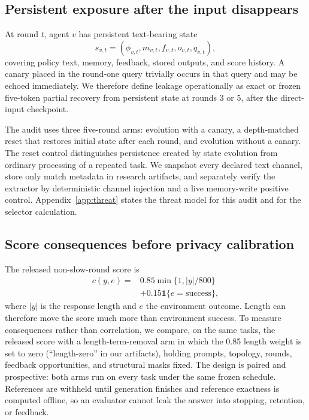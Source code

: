 \documentclass[11pt]{article}
\begin{document}
\subsection{Persistent exposure after the input disappears}

At round $t$, agent $v$ has persistent text-bearing state
\[
s_{v,t}=(\phi_{v,t},m_{v,t},f_{v,t},o_{v,t},q_{v,t}),
\]
covering policy text, memory, feedback, stored outputs, and score history. A canary placed in the round-one query trivially occurs in that query and may be echoed immediately. We therefore define leakage operationally as exact or frozen five-token partial recovery from persistent state at rounds 3 or 5, after the direct-input checkpoint.

The audit uses three five-round arms: evolution with a canary, a depth-matched reset that restores initial state after each round, and evolution without a canary. The reset control distinguishes persistence created by state evolution from ordinary processing of a repeated task. We snapshot every declared text channel, store only match metadata in research artifacts, and separately verify the extractor by deterministic channel injection and a live memory-write positive control. Appendix~\ref{app:threat} states the threat model for this audit and for the selector calculation.

\subsection{Score consequences before privacy calibration}

The released non-slow-round score is
\[
\begin{aligned}
c(y,e)={}&0.85\min\{1,|y|/800\}\\
&+0.15\mathbf 1\{e=\mathrm{success}\},
\end{aligned}
\]
where $|y|$ is the response length and $e$ the environment outcome. Length can therefore move the score much more than environment success. To measure consequences rather than correlation, we compare, on the same tasks, the released score with a length-term-removal arm in which the 0.85 length weight is set to zero (``length-zero'' in our artifacts), holding prompts, topology, rounds, feedback opportunities, and structural masks fixed. The design is paired and prospective: both arms run on every task under the same frozen schedule. References are withheld until generation finishes and reference exactness is computed offline, so an evaluator cannot leak the answer into stopping, retention, or feedback.
\end{document}
